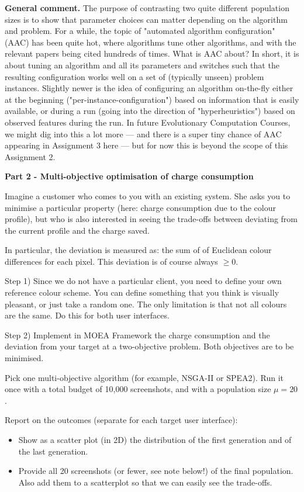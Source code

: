 \documentclass{pracs}
\begin{document}
\textbf{General comment.} The purpose of contrasting two quite different population sizes is to show that parameter choices can matter depending on the algorithm and problem. For a while, the topic of "automated algorithm configuration" (AAC) has been quite hot, where algorithms tune other algorithms, and with the relevant papers being cited hundreds of times. What is AAC about? In short, it is about tuning an algorithm and all its parameters and switches such that the resulting configuration works well on a set of (typically unseen) problem instances.
Slightly newer is the idea of configuring an algorithm on-the-fly either at the beginning ("per-instance-configuration") based on information that is easily available, or during a run (going into the direction of "hyperheuristics") based on observed features during the run.
In future Evolutionary Computation Courses, we might dig into this a lot more --- and there is a super tiny chance of AAC appearing in Assignment 3 here --- but for now this is beyond the scope of this Assignment 2.

\noindent\textbf{Part 2 - Multi-objective optimisation of charge consumption}

Imagine a customer who comes to you with an existing system. She asks you to minimise a particular property (here: charge consumption due to the colour profile), but who is also interested in seeing the trade-offs between deviating from the current profile and the charge saved.

In particular, the deviation is measured as: the sum of of Euclidean colour differences for each pixel. This deviation is of course always $\geq0$.

Step 1) Since we do not have a particular client, you need to define your own reference colour scheme. You can define something that you think is visually pleasant, or just take a random one. The only limitation is that not all colours are the same. Do this for both user interfaces.

Step 2) Implement in MOEA Framework the charge consumption and the deviation from your target at a two-objective problem. Both objectives are to be minimised.

Pick one multi-objective algorithm (for example, NSGA-II or SPEA2). Run it once with a total budget of 10,000 screenshots, and with a population size $\mu=20$.

Report on the outcomes (separate for each target user interface):
\begin{itemize}
\item Show as a scatter plot (in 2D) the distribution of the first generation and of the last generation.
\item Provide all 20 screenshots (or fewer, see note below!) of the final population. Also add them to a scatterplot so that we can easily see the trade-offs.
\end{itemize}
\end{document}
